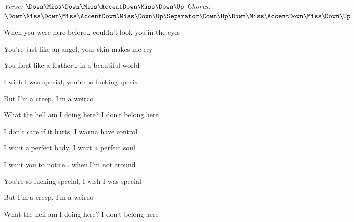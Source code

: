 \begin{song}


\begin{headerbox}
\RaiseBoxWithAccents
{} \quad
\textit{Verse:} $\Down\Miss\Down\Miss\AccentDown\Miss\Down\Up$ \quad
\textit{Chorus:} $\Down\Miss\Down\Miss\AccentDown\Miss\Down\Up \Separator \Down\Up\Down\Miss\AccentDown\Miss\Down\Up$
\end{headerbox}

\begin{hchordbox}
\end{hchordbox}

\Large

\bigskip

\Intro {}    \par

\bigskip

When you were here before… couldn't look you in the eyes \par
You're just like an angel, your skin makes me cry \par
You float like a feather… in a beautiful world \par
I wish I was special, you're so fucking special \par

\bigskip

But I'm a creep, I'm a weirdo \par
What the hell am I doing here? I don't belong here \par

\bigskip

I don't care if it hurts, I wanna have control \par
I want a perfect body, I want a perfect soul \par
I want you to notice… when I'm not around \par
You're so fucking special, I wish I was special \par

\bigskip

But I'm a creep, I'm a weirdo \par
What the hell am I doing here? I don't belong here \par

\bigskip


\end{song}
